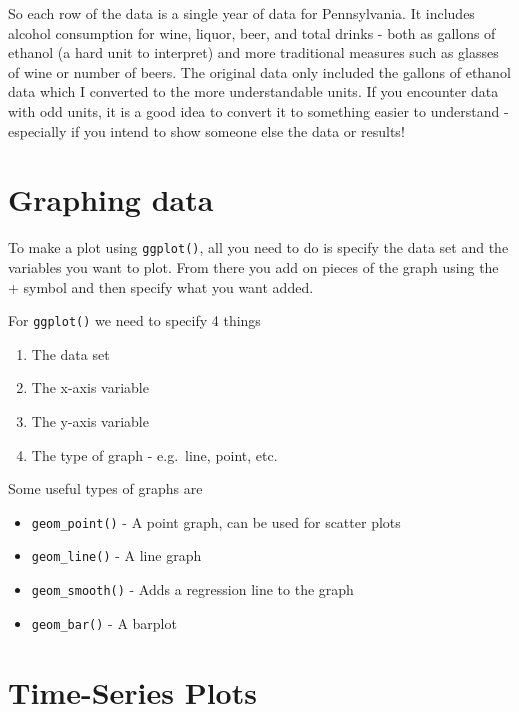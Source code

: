 \documentclass[
  12pt,
]{book}
\providecommand{\tightlist}{%
  \setlength{\itemsep}{0pt}\setlength{\parskip}{0pt}}
\begin{document}
So each row of the data is a single year of data for Pennsylvania. It includes alcohol consumption for wine, liquor, beer, and total drinks - both as gallons of ethanol (a hard unit to interpret) and more traditional measures such as glasses of wine or number of beers. The original data only included the gallons of ethanol data which I converted to the more understandable units. If you encounter data with odd units, it is a good idea to convert it to something easier to understand - especially if you intend to show someone else the data or results!

\hypertarget{graphing-data}{%
\section{Graphing data}\label{graphing-data}}

To make a plot using \texttt{ggplot()}, all you need to do is specify the data set and the variables you want to plot. From there you add on pieces of the graph using the + symbol and then specify what you want added.

For \texttt{ggplot()} we need to specify 4 things

\begin{enumerate}
\def\labelenumi{\arabic{enumi}.}
\tightlist
\item
  The data set
\item
  The x-axis variable
\item
  The y-axis variable
\item
  The type of graph - e.g.~line, point, etc.
\end{enumerate}

Some useful types of graphs are

\begin{itemize}
\tightlist
\item
  \texttt{geom\_point()} - A point graph, can be used for scatter plots
\item
  \texttt{geom\_line()} - A line graph
\item
  \texttt{geom\_smooth()} - Adds a regression line to the graph
\item
  \texttt{geom\_bar()} - A barplot
\end{itemize}

\hypertarget{timeplots}{%
\section{Time-Series Plots}\label{timeplots}}
\end{document}
